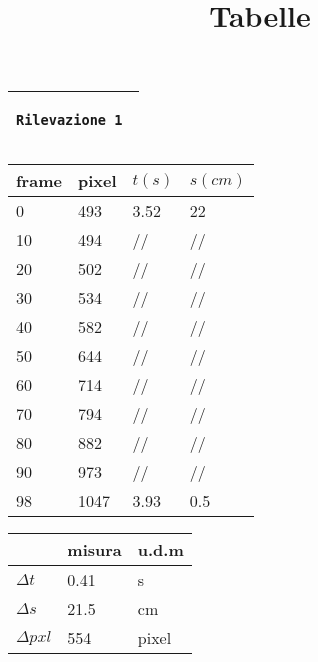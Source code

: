 \documentclass{article}
\title{Tabelle}
\begin{document}

\begin{center}
\begin{tabular}{|m{15em}|}
	\hline
	
	\begin{center}
		\texttt \bf \large Rilevazione 1
	\end{center} \\
	\hline
\end{tabular}

\vspace{15pt}

\begin{tabular}{ | m{3em} | m{3em} | m{2.5em}| m{2.5em} | } 
 \hline
 \vspace{5pt} frame \vspace{5pt}  &  pixel & $t(s)$ & $s(cm)$\\ 
 \hline
 \hline
 0 & 493 & 3.52  & 22\\ 
 \hline
 10 & 494 & //  & //\\
 \hline
 20 & 502 & //  & //\\ 
 \hline
 30 & 534 & //  & //\\ 
 \hline
 40 & 582 & //  & //\\ 
 \hline
 50 & 644 & //  & //\\ 
 \hline
 60 & 714 & //  & //\\ 
 \hline
 70 & 794 & //  & //\\ 
 \hline
 80 & 882 & //  & //\\ 
 \hline
 90 & 973 & //  & //\\ 
 \hline
 98 & 1047 & 3.93  & 0.5\\ 
 \hline
\end{tabular}

\vspace{5pt}

\begin{tabular}{ | m{3em} | m{3em} | m{1cm}| } 
 \hline
   &  misura & u.d.m \\ 
 \hline
 \hline
 $\Delta t$   &  0.41 	& s\\
 \hline
 $\Delta s$   &  21.5	& cm\\
 \hline
 $\Delta pxl$ & 554	& pixel\\
 \hline
\end{tabular}
\end{center}


\end{document}
